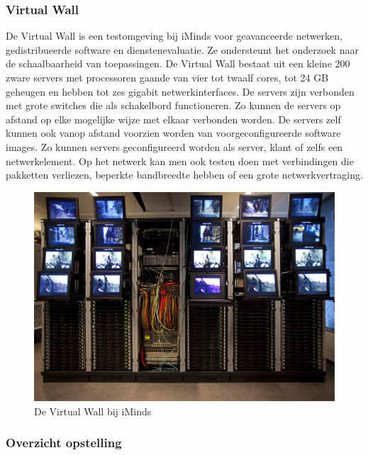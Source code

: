 \subsubsection{Virtual Wall}

De Virtual Wall is een testomgeving bij iMinds voor geavanceerde netwerken, gedistribueerde software en dienstenevaluatie.
Ze ondersteunt het onderzoek naar de schaalbaarheid van toepassingen.
De Virtual Wall bestaat uit een kleine 200 zware servers met processoren gaande van vier tot twaalf cores,
tot 24 GB geheugen en hebben tot zes gigabit netwerkinterfaces.
De servers zijn verbonden met grote switches die als schakelbord functioneren.
Zo kunnen de servers op afstand op elke mogelijke wijze met elkaar verbonden worden.
De servers zelf kunnen ook vanop afstand voorzien worden van voorgeconfigureerde software images.
Zo kunnen servers geconfigureerd worden als server, klant of zelfs een netwerkelement.
Op het netwerk kan men ook testen doen met verbindingen die pakketten verliezen, beperkte bandbreedte hebben of
een grote netwerkvertraging\cite{virtual-wall-uitleg, virtual-wall-specs}.

\begin{figure}[h]
	\centering
	\includegraphics[scale=0.50]{figures/virtual-wall}
	\caption[De Virtual Wall bij iMinds]{De Virtual Wall bij iMinds\cite{virtual-wall-specs}}
	\label{fig-virtual-wall}
\end{figure}

\subsubsection{Overzicht opstelling}

